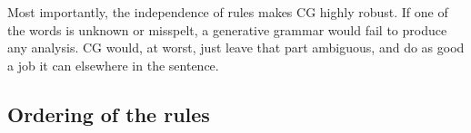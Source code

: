 {Most importantly, the independence of rules makes CG highly robust.
If one of the words is unknown or misspelt, a generative grammar would fail to produce any analysis. 
CG would, at worst, just leave that part ambiguous, and do as good a job it can elsewhere in the sentence.






\subsection{Ordering of the rules}\label{sec:ordering}

}
